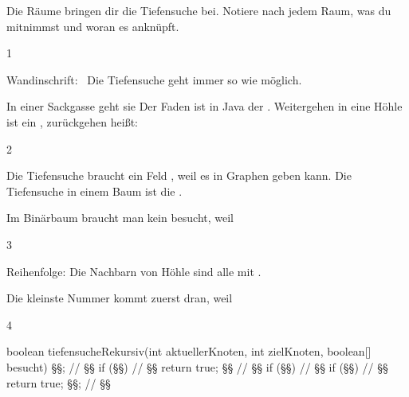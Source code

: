 \documentclass[11pt,a4paper]{article}
\begin{document}

Die Räume bringen dir die Tiefensuche bei. Notiere nach jedem Raum, was du mitnimmst und woran es anknüpft. 

\begin{aufgabe}{1}
\begin{lueckentext}
Wandinschrift:  \ Die Tiefensuche geht immer so  wie möglich.\par
In einer Sackgasse geht sie
Der Faden ist in Java der . Weitergehen in eine Höhle ist ein , zurückgehen heißt:
\end{lueckentext}
\end{aufgabe}

\begin{aufgabe}{2}
\begin{lueckentext}
Die Tiefensuche braucht ein Feld  , weil es in Graphen  geben kann. Die Tiefensuche in einem Baum ist die .\par Im Binärbaum braucht man kein besucht, weil
\end{lueckentext}
\end{aufgabe}

\begin{aufgabe}{3}
\begin{lueckentext}
Reihenfolge:  \quad Die Nachbarn von Höhle  sind alle  mit .\par Die kleinste Nummer kommt zuerst dran, weil
\end{lueckentext}
\end{aufgabe}

\begin{aufgabe}{4}
\begin{javaluecke}[basicstyle=\linespread{1.45}\scriptsize\ttfamily]
boolean tiefensucheRekursiv(int aktuellerKnoten, int zielKnoten, boolean[] besucht) {
   §§;                       // §§
   if (§§) {                    // §§
      return true;
   }
   §§ {                     // §§
      if (§§) {         // §§
         if (§§) { // §§
            return true;
         }
      }
   }
   §§;                                             // §§
}
\end{javaluecke}
\end{aufgabe}
\end{document}
